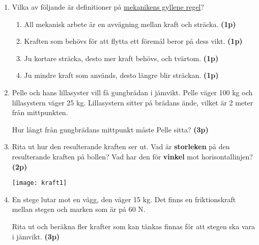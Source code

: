 \documentclass[11pt]{article}
\begin{document}
\begin{enumerate}[itemsep=0.5em]
      \item
            Vilka av följande är definitioner på
            \uline{mekanikens gyllene regel}?
            \begin{enumerate}[label=\alph*)]
                  \item All mekanisk arbete är en avvägning mellan kraft
                        och sträcka. \textbf{(1p)}
                  \item Kraften som behövs för att flytta ett föremål beror
                        på dess vikt. \textbf{(1p)}
                  \item Ju kortare sträcka, desto mer kraft behövs, och
                        tvärtom. \textbf{(1p)}
                  \item Ju mindre kraft som används, desto längre blir
                        sträckan. \textbf{(1p)}
            \end{enumerate}

            \newpage
      \item
            Pelle och hans lillasyster vill få gungbrädan i jämvikt. Pelle
            väger 100 kg och lillasystern väger 25 kg. Lillasystern sitter på
            brädans ände,
            vilket är 2 meter från mittpunkten.

            Hur långt från gungbrädans
            mittpunkt måste
            Pelle sitta? \textbf{(3p)}
            \begin{center}
                  
            \end{center}

      \item
            Rita ut hur den resulterande
            kraften ser
            ut.
            Vad är \textbf{storleken} på den resulterande kraften på bollen?
            Vad har
            den för \textbf{vinkel} mot horisontallinjen? \textbf{(2p)}
            \begin{center}
                  \texttt{[image: kraft1]}
            \end{center}

      \item
            \begin{minipage}[t]{0.6\textwidth}
                  En stege lutar mot en vägg, den väger 15
                  kg. Det finns en friktionskraft mellan stegen och marken
                  som är på 60 N.

                  Rita ut
                  och beräkna fler krafter som kan tänkas finnas för att
                  stegen ska vara i
                  jämvikt. \textbf{(3p)}
            \end{minipage}
            \hspace{2em}
            \begin{adjustbox}{valign=t}
                  
            \end{adjustbox}


\end{enumerate}
\end{document}
